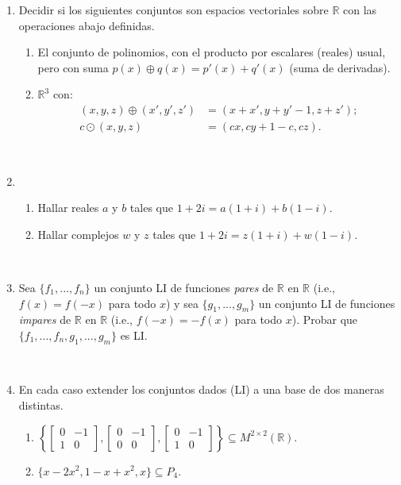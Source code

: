 \documentclass[11pt,spanish,makeidx]{amsbook}
\newcommand\R{\mathbb{R}}
\begin{document}
\begin{enumerate}
	
	
	\item Decidir si los siguientes conjuntos son espacios vectoriales sobre $\R$ con las operaciones abajo definidas.
	\begin{enumerate}
		\item El conjunto de polinomios, con el producto por escalares (reales) usual, pero con suma
		$p(x)\oplus q(x) = p'(x) + q' (x)$ (suma de derivadas).
		\item $\R^3$ con:
		\begin{align*}
		(x,y,z)\oplus(x',y',z') &=(x + x', y + y' - 1, z + z');\\
		c\odot(x,y,z) &= (cx,cy + 1 - c, cz).
		\end{align*}
	\end{enumerate}
		
	\
		
	\item
	\begin{enumerate}
		\item Hallar reales $a$ y $b$ tales que $1+2i=a(1+i)+b(1-i)$.
		\item  Hallar complejos $w$ y $z$ tales que $1+2i=z(1+i)+w(1-i)$.
	\end{enumerate}
		
	\
		
	\item Sea $\{f_1,...,f_n\}$ un conjunto LI de funciones {\it pares} de $\R$ en $\R$ (i.e., $f(x)=f(-x)$ para todo $x$) y sea $\{g_1,...,g_m\}$ un conjunto LI de funciones {\it impares}
	de $\R$ en $\R$ (i.e., $f(-x)=-f(x)$ para todo $x$).
	Probar que $\{f_1,...,f_n,g_1,...,g_m\}$ es LI.
		
	\
		
	\item En cada caso extender los conjuntos dados (LI) a una base de dos maneras distintas.
	\begin{enumerate}
		\item $\left\{ \begin{bmatrix} 0 & -1 \\ 1 & 0 \end{bmatrix}, \begin{bmatrix} 0 & -1 \\ 0 & 0 \end{bmatrix},\begin{bmatrix} 0 & -1
		\\ 1 & 0 \end{bmatrix} \right\}
		\subseteq M^{2\times 2}(\R)$.
		\item $\{x-2x^2, 1-x+x^2, x\} \subseteq P_4$.
	\end{enumerate}
		

\end{enumerate}
\end{document}
